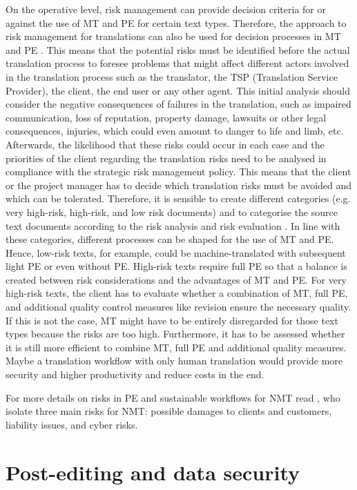 On the operative level, risk management can provide decision criteria for or against the use of MT and PE for certain text types. Therefore, the approach to risk management for translations can also be used for decision processes in MT and PE \citep{canfora2018ostriches}. This means that the potential risks must be identified before the actual translation process to foresee problems that might affect different actors involved in the translation process such as the translator, the TSP (Translation Service Provider), the client, the end user or any other agent. This initial analysis should consider the negative consequences of failures in the translation, such as impaired communication, loss of reputation, property damage, lawsuits or other legal consequences, injuries, which could even amount to danger to life and limb, etc. Afterwards, the likelihood that these risks could occur in each case and the priorities of the client regarding the translation risks need to be analysed in compliance with the strategic risk management policy. This means that the client or the project manager has to decide which translation risks must be avoided and which can be tolerated. Therefore, it is sensible to create different categories (e.g. very high-risk, high-risk, and low risk documents) and to categorise the source text documents according to the risk analysis and risk evaluation \citep{canfora2018ostriches}. In line with these categories, different processes can be shaped for the use of MT and PE. Hence, low-risk texts, for example, could be machine-translated with subsequent light PE or even without PE. High-risk texts require full PE so that a balance is created between risk considerations and the advantages of MT and PE. For very high-risk texts, the client has to evaluate whether a combination of MT, full PE, and additional quality control measures like revision ensure the necessary quality. If this is not the case, MT might have to be entirely disregarded for those text types because the risks are too high. Furthermore, it has to be assessed whether it is still more efficient to combine MT, full PE and additional quality measures. Maybe a translation workflow with only human translation would provide more security and higher productivity and reduce costs in the end.

For more details on risks in PE and sustainable workflows for NMT read \citet{canfora2020risks}, who isolate three main risks for NMT: possible damages to clients and customers, liability issues, and cyber risks.

\section{Post-editing and data security}\label{sec:7:2}

